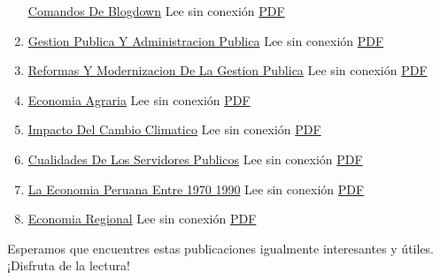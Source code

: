 \documentclass[
  stu,
  floatsintext,
  longtable,
  a4paper,
  nolmodern,
  notxfonts,
  notimes,
  colorlinks=true,linkcolor=blue,citecolor=blue,urlcolor=blue]{apa7}
\begin{document}
\begin{enumerate}
  \href{https://achalmaedison.netlify.app/blog/posts/2021-07-14-comandos-de-blogdown}{Comandos
  De Blogdown} Lee sin conexión
  \href{https://achalmaedison.netlify.app/blog/posts/2021-07-14-comandos-de-blogdown/index.pdf}{PDF}
\item
  \href{https://achalmaedison.netlify.app/blog/posts/2021-10-01-gestion-publica-y-administracion-publica}{Gestion
  Publica Y Administracion Publica} Lee sin conexión
  \href{https://achalmaedison.netlify.app/blog/posts/2021-10-01-gestion-publica-y-administracion-publica/index.pdf}{PDF}
\item
  \href{https://achalmaedison.netlify.app/blog/posts/2021-10-01-reformas-y-modernizacion-de-la-gestion-publica}{Reformas
  Y Modernizacion De La Gestion Publica} Lee sin conexión
  \href{https://achalmaedison.netlify.app/blog/posts/2021-10-01-reformas-y-modernizacion-de-la-gestion-publica/index.pdf}{PDF}
\item
  \href{https://achalmaedison.netlify.app/blog/posts/2022-04-22-economia-agraria}{Economia
  Agraria} Lee sin conexión
  \href{https://achalmaedison.netlify.app/blog/posts/2022-04-22-economia-agraria/index.pdf}{PDF}
\item
  \href{https://achalmaedison.netlify.app/blog/posts/2022-06-02-impacto-del-cambio-climatico}{Impacto
  Del Cambio Climatico} Lee sin conexión
  \href{https://achalmaedison.netlify.app/blog/posts/2022-06-02-impacto-del-cambio-climatico/index.pdf}{PDF}
\item
  \href{https://achalmaedison.netlify.app/blog/posts/2023-05-11-cualidades-de-los-servidores-publicos}{Cualidades
  De Los Servidores Publicos} Lee sin conexión
  \href{https://achalmaedison.netlify.app/blog/posts/2023-05-11-cualidades-de-los-servidores-publicos/index.pdf}{PDF}
\item
  \href{https://achalmaedison.netlify.app/blog/posts/2023-05-12-la-economia-peruana-entre-1970-1990}{La
  Economia Peruana Entre 1970 1990} Lee sin conexión
  \href{https://achalmaedison.netlify.app/blog/posts/2023-05-12-la-economia-peruana-entre-1970-1990/index.pdf}{PDF}
\item
  \href{https://achalmaedison.netlify.app/blog/posts/2023-05-16-economia-regional}{Economia
  Regional} Lee sin conexión
  \href{https://achalmaedison.netlify.app/blog/posts/2023-05-16-economia-regional/index.pdf}{PDF}
\end{enumerate}

Esperamos que encuentres estas publicaciones igualmente interesantes y
útiles. ¡Disfruta de la lectura!
\end{document}
